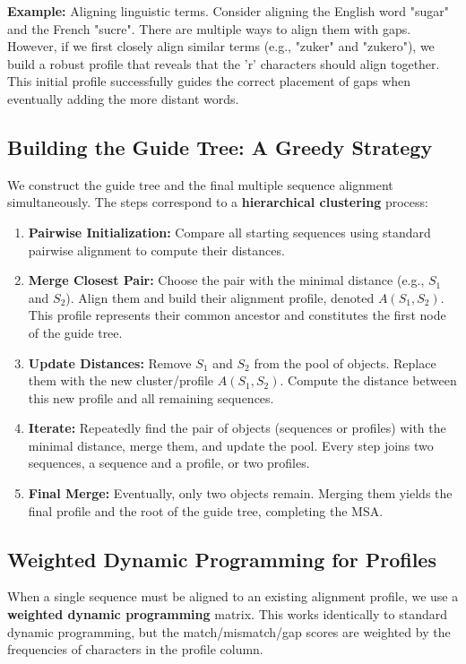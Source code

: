 \textbf{Example:} Aligning linguistic terms.
Consider aligning the English word "sugar" and the French "sucre". There are multiple ways to align them with gaps. However, if we first closely align similar terms (e.g., "zuker" and "zukero"), we build a robust profile that reveals that the 'r' characters should align together. This initial profile successfully guides the correct placement of gaps when eventually adding the more distant words.

\subsection{Building the Guide Tree: A Greedy Strategy}
We construct the guide tree and the final multiple sequence alignment simultaneously. The steps correspond to a \textbf{hierarchical clustering} process:

\begin{enumerate}
  \item \textbf{Pairwise Initialization:} Compare all starting sequences using standard pairwise alignment to compute their distances.
  \item \textbf{Merge Closest Pair:} Choose the pair with the minimal distance (e.g., $S_1$ and $S_2$). Align them and build their alignment profile, denoted $A(S_1, S_2)$. This profile represents their common ancestor and constitutes the first node of the guide tree.
  \item \textbf{Update Distances:} Remove $S_1$ and $S_2$ from the pool of objects. Replace them with the new cluster/profile $A(S_1, S_2)$. Compute the distance between this new profile and all remaining sequences.
  \item \textbf{Iterate:} Repeatedly find the pair of objects (sequences or profiles) with the minimal distance, merge them, and update the pool. Every step joins two sequences, a sequence and a profile, or two profiles.
  \item \textbf{Final Merge:} Eventually, only two objects remain. Merging them yields the final profile and the root of the guide tree, completing the MSA.
\end{enumerate}

\subsection{Weighted Dynamic Programming for Profiles}
When a single sequence must be aligned to an existing alignment profile, we use a \textbf{weighted dynamic programming} matrix. This works identically to standard dynamic programming, but the match/mismatch/gap scores are weighted by the frequencies of characters in the profile column.

